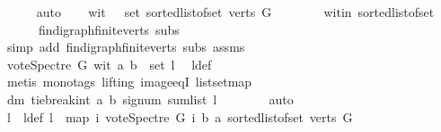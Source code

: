 \begin{isabellebody}
\ \ \ \ \isamarkupfalse%
\ auto\isanewline
\ \ \isamarkupfalse%
\ {\isachardoublequoteopen}wit\ {\isasymin}\ \ set\ {\isacharparenleft}{\kern0pt}sorted{\isacharunderscore}{\kern0pt}list{\isacharunderscore}{\kern0pt}of{\isacharunderscore}{\kern0pt}set\ {\isacharparenleft}{\kern0pt}verts\ G{\isacharparenright}{\kern0pt}{\isacharparenright}{\kern0pt}{\isachardoublequoteclose}\ \isanewline
\ \ \ \ \isamarkupfalse%
\ \ wit{\isacharunderscore}{\kern0pt}in\ sorted{\isacharunderscore}{\kern0pt}list{\isacharunderscore}{\kern0pt}of{\isacharunderscore}{\kern0pt}set{\isacharparenleft}{\kern0pt}{}{\isacharparenright}{\kern0pt}\ \isanewline
\ \ \ \ \ \ fin{\isacharunderscore}{\kern0pt}digraph{\isachardot}{\kern0pt}finite{\isacharunderscore}{\kern0pt}verts\ subs\isanewline
\ \ \ \ \isamarkupfalse%
\ {\isacharparenleft}{\kern0pt}simp\ add{\isacharcolon}{\kern0pt}\ fin{\isacharunderscore}{\kern0pt}digraph{\isachardot}{\kern0pt}finite{\isacharunderscore}{\kern0pt}verts\ subs\ assms{\isacharparenleft}{\kern0pt}{}{\isacharparenright}{\kern0pt}{\isacharparenright}{\kern0pt}\ \isanewline
\ \ \isamarkupfalse%
\ \isamarkupfalse%
\ {\isachardoublequoteopen}vote{\isacharunderscore}{\kern0pt}Spectre\ G\ wit\ a\ b\ {\isasymin}\ set\ l{\isachardoublequoteclose}\ \isamarkupfalse%
\ l{\isacharunderscore}{\kern0pt}def\isanewline
\ \ \ \ \isamarkupfalse%
\ {\isacharparenleft}{\kern0pt}metis\ {\isacharparenleft}{\kern0pt}mono{\isacharunderscore}{\kern0pt}tags{\isacharcomma}{\kern0pt}\ lifting{\isacharparenright}{\kern0pt}\ image{\isacharunderscore}{\kern0pt}eqI\ list{\isachardot}{\kern0pt}set{\isacharunderscore}{\kern0pt}map{\isacharparenright}{\kern0pt}\isanewline
\ \ \isamarkupfalse%
\ \isamarkupfalse%
\ dm{\isacharcolon}{\kern0pt}\ {\isachardoublequoteopen}tie{\isacharunderscore}{\kern0pt}break{\isacharunderscore}{\kern0pt}int\ a\ b\ {\isacharparenleft}{\kern0pt}signum\ {\isacharparenleft}{\kern0pt}sum{\isacharunderscore}{\kern0pt}list\ l{\isacharparenright}{\kern0pt}{\isacharparenright}{\kern0pt}\ {\isasymin}\ {\isacharbraceleft}{\kern0pt}{\isacharminus}{\kern0pt}{}{\isacharcomma}{\kern0pt}{}{\isacharbraceright}{\kern0pt}{\isachardoublequoteclose}\isanewline
\ \ \ \ \isamarkupfalse%
\ auto\ \ \isanewline
\ \ \isamarkupfalse%
\ l{}\ \ l{}{\isacharunderscore}{\kern0pt}def{\isacharcolon}{\kern0pt}\ {\isachardoublequoteopen}l{}\ {\isacharequal}{\kern0pt}\ {\isacharparenleft}{\kern0pt}map\ {\isacharparenleft}{\kern0pt}{\isasymlambda}i{\isachardot}{\kern0pt}\ vote{\isacharunderscore}{\kern0pt}Spectre\ G\ i\ b\ a{\isacharparenright}{\kern0pt}\ {\isacharparenleft}{\kern0pt}sorted{\isacharunderscore}{\kern0pt}list{\isacharunderscore}{\kern0pt}of{\isacharunderscore}{\kern0pt}set\ {\isacharparenleft}{\kern0pt}verts\ G{\isacharparenright}{\kern0pt}{\isacharparenright}{\kern0pt}{\isacharparenright}{\kern0pt}{\isachardoublequoteclose}\isanewline

\end{isabellebody}
